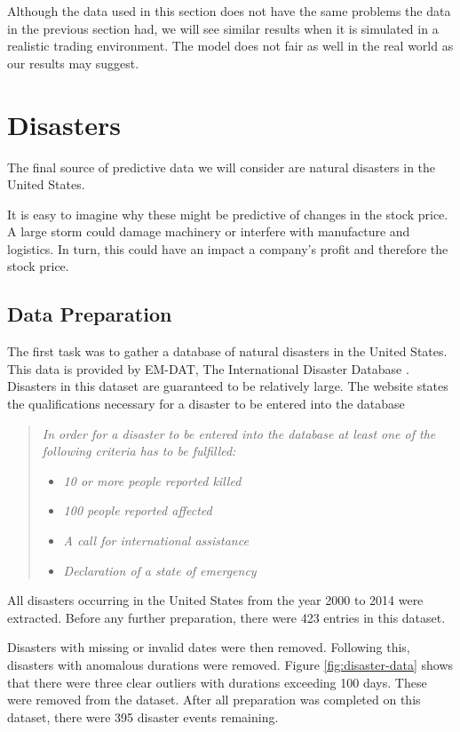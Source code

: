 \documentclass{report}
\begin{document}
Although the data used in this section does not have the same problems the data in the previous section had, we will see similar results when it is simulated in a realistic trading environment. The model does not fair as well in the real world as our results may suggest.

\section{Disasters}

The final source of predictive data we will consider are natural disasters in the United States. 

It is easy to imagine why these might be predictive of changes in the stock price. A large storm could damage machinery or interfere with manufacture and logistics. In turn, this could have an impact a company's profit and therefore the stock price.

\subsection{Data Preparation}

The first task was to gather a database of natural disasters in the United States. This data is provided by EM-DAT, The International Disaster Database \cite{disasterdb}. Disasters in this dataset are guaranteed to be relatively large. The website states the qualifications necessary for a disaster to be entered into the database

\begin{quotation}
\textit{In order for a disaster to be entered into the database at least one of the following criteria has to be fulfilled:}
\begin{itemize}
  \item \textit{10 or more people reported killed}
  \item \textit{100 people reported affected}
  \item \textit{A call for international assistance}
  \item \textit{Declaration of a state of emergency}
\end{itemize}
\end{quotation}

 All disasters occurring in the United States from the year 2000 to 2014 were extracted. Before any further preparation, there were 423 entries in this dataset.

Disasters with missing or invalid dates were then removed. Following this, disasters with anomalous durations were removed. Figure \ref{fig:disaster-data} shows that there were three clear outliers with durations exceeding 100 days. These were removed from the dataset. After all preparation was completed on this dataset, there were 395 disaster events remaining.
\end{document}
